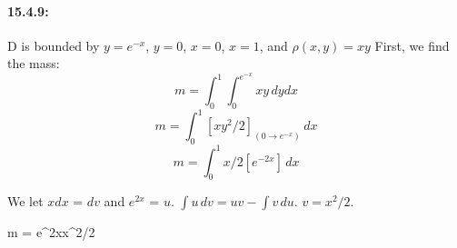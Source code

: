 \documentclass[a4paper,12pt]{article}
\begin{document}
\paragraph{15.4.9: } D is bounded by $y = e^{-x}$, $y = 0$, $x = 0$, $x = 1$, and $\rho(x, y) = xy$
First, we find the mass: 
$$m = \int_0^1 \int_0^{e^{-x}} xy \, dy dx $$
$$m = \int_0^1 [xy^2/2]_{(0 \to e^{-x})} \, dx $$
$$m = \int_0^1 x/2[e^{-2x}] \, dx $$

We let $x dx$ = $dv$ and $e^{2x}$ = $u$. $\int u \, dv = uv - \int v \, du$. $v = x^2/2$. 

$$m = e^{2x}x^2/2
\end{document}
